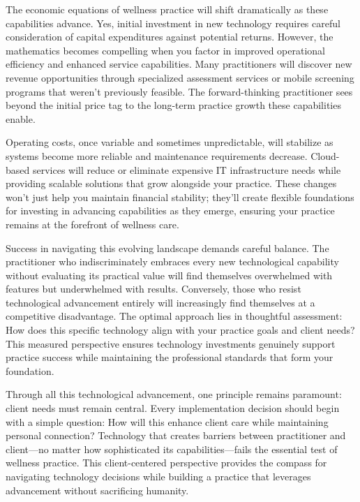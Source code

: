 \documentclass[
  Letterpaper,
]{scrbook}
\begin{document}
The economic equations of wellness practice will shift dramatically as
these capabilities advance. Yes, initial investment in new technology
requires careful consideration of capital expenditures against potential
returns. However, the mathematics becomes compelling when you factor in
improved operational efficiency and enhanced service capabilities. Many
practitioners will discover new revenue opportunities through
specialized assessment services or mobile screening programs that
weren't previously feasible. The forward-thinking practitioner sees
beyond the initial price tag to the long-term practice growth these
capabilities enable.

Operating costs, once variable and sometimes unpredictable, will
stabilize as systems become more reliable and maintenance requirements
decrease. Cloud-based services will reduce or eliminate expensive IT
infrastructure needs while providing scalable solutions that grow
alongside your practice. These changes won't just help you maintain
financial stability; they'll create flexible foundations for investing
in advancing capabilities as they emerge, ensuring your practice remains
at the forefront of wellness care.

Success in navigating this evolving landscape demands careful balance.
The practitioner who indiscriminately embraces every new technological
capability without evaluating its practical value will find themselves
overwhelmed with features but underwhelmed with results. Conversely,
those who resist technological advancement entirely will increasingly
find themselves at a competitive disadvantage. The optimal approach lies
in thoughtful assessment: How does this specific technology align with
your practice goals and client needs? This measured perspective ensures
technology investments genuinely support practice success while
maintaining the professional standards that form your foundation.

Through all this technological advancement, one principle remains
paramount: client needs must remain central. Every implementation
decision should begin with a simple question: How will this enhance
client care while maintaining personal connection? Technology that
creates barriers between practitioner and client---no matter how
sophisticated its capabilities---fails the essential test of wellness
practice. This client-centered perspective provides the compass for
navigating technology decisions while building a practice that leverages
advancement without sacrificing humanity.
\end{document}
